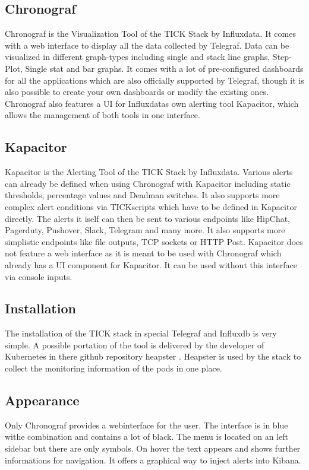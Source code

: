 \subsection{Chronograf}
Chronograf is the Visualization Tool of the TICK Stack by Influxdata. It comes with a web interface to display all the data collected by Telegraf. Data can be visualized in different graph-types including single and stack line graphs, Step-Plot, Single stat and bar graphs. It comes with a lot of pre-configured dashboards for all the applications which are also officially supported by Telegraf, though it is also possible to create your own dashboards or modify the existing ones. 
Chronograf also features a UI for Influxdatas own alerting tool Kapacitor, which allows the management of both tools in one interface.
\subsection{Kapacitor}
Kapacitor is the Alerting Tool of the TICK Stack by Influxdata. Various alerts can already be defined when using Chronograf with Kapacitor including static thresholds, percentage values and Deadman switches. It also supports more complex alert conditions via TICKscripts which have to be defined in Kapacitor directly.
The alerts it iself can then be sent to various endpoints like HipChat, Pagerduty, Pushover, Slack, Telegram and many more. It also supports more simplistic endpoints like file outputs, TCP sockets or HTTP Post.
Kapacitor does not feature a web interface as it is meant to be used with Chronograf which already has a UI component for Kapacitor. It can be used without this interface via console inputs.
\subsection{Installation}
The installation of the TICK stack in special Telegraf and Influxdb is very simple. A possible portation of the tool is delivered by the developer of Kubernetes in there github repository heapster \cite{heapster}. Heapster is used by the stack to collect the monitoring information of the pods in one place.
\subsection{Appearance}
Only Chronograf provides a webinterface for the user. The interface is in blue withe combination and contains a lot of black. The menu is located on an left sidebar but there are only symbols. On hover the text appears and shows further informations for navigation. It offers a graphical way to inject alerts into Kibana.

